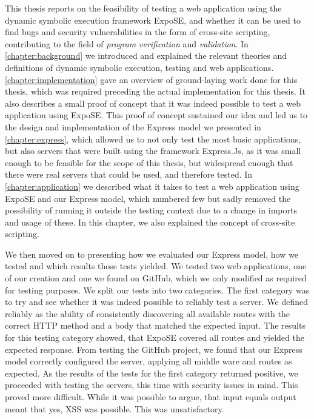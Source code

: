 This thesis reports on the feasibility of testing a web application using the dynamic symbolic execution framework ExpoSE, 
and whether it can be used to find bugs and security vulnerabilities in the form of cross-site scripting, 
contributing to the field of \textit{program} \textit{verification} and \textit{validation}.
In \autoref{chapter:background} we introduced and explained the relevant theories and definitions of dynamic symbolic execution, testing and web applications.
\autoref{chapter:implementation} gave an overview of ground-laying work done for this thesis, which was required preceding the actual implementation for this thesis.
It also describes a small proof of concept that it was indeed possible to test a web application using ExpoSE. 
This proof of concept sustained our idea and led us to the design and implementation of the Express model we presented in \autoref{chapter:express}, which allowed us to not only test the most basic applications,
but also servers that were built using the framework Express.Js, as it was small enough to be feasible for the scope of this thesis, but widespread enough that 
there were real servers that could be used, and therefore tested. In \autoref{chapter:application} we described what it takes to test a web application using ExpoSE and our Express model, 
which numbered few but sadly removed the possibility of running it outside the testing context due to a change in imports and usage of these.
In this chapter, we also explained the concept of cross-site scripting.

We then moved on to presenting how we evaluated our Express model, how we tested and which results those tests yielded. We tested two web applications, one of our creation and one we found on GitHub, which we 
only modified as required for testing purposes. We split our tests into two categories. The first category was to try and see whether it was indeed possible to reliably test a server. 
We defined reliably as the ability of consistently discovering all available routes with the correct HTTP method and a body that matched the expected input. The results for this testing category showed,
that ExpoSE covered all routes and yielded the expected response. From testing the GitHub project, we found that our Express model correctly configured the server, applying all middle ware and routes as expected.
As the results of the tests for the first category returned positive, we proceeded with testing the servers, this time with security issues in mind. This proved more difficult. While it was possible to argue, that input equals output meant that yes, XSS was possible. This was unsatisfactory. 




